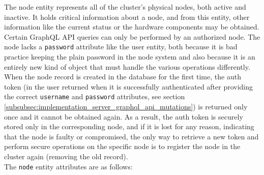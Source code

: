 The node entity represents all of the cluster's physical nodes, both active and inactive.
It holds critical information about a node, and from this entity, other
information like the current status or the hardware components may be obtained. \\ %
Certain GraphQL API queries can only be performed by an authorized node. The node
lacks a \texttt{password} attribute like the user entity, both because it is bad
practice keeping the plain password in the node system and also because it is an
entirely new kind of object that must handle the various operations differently.
When the node record is created in the database for the first time, the auth token
(in the user returned when it is successfully authenticated after providing the
correct \texttt{username} and \texttt{password} attributes, see section \ref{subsubsec:implementation_server_graphql_api_mutations})
is returned only once and it cannot be obtained again. As a result, the auth
token is securely stored only in the corresponding node, and if it is lost for any
reason, indicating that the node is faulty or compromised, the only way to retrieve
a new token and perform secure operations on the specific node is to register the
node in the cluster again (removing the old record). \\ %
The \texttt{node} entity attributes are as follows:
